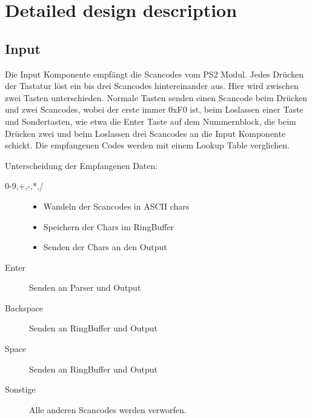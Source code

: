 \section{Detailed design description}



\subsection{Input}
Die Input Komponente empfängt die Scancodes vom PS2 Modul. Jedes Drücken der Tastatur löst ein bis drei Scancodes hintereinander aus.
Hier wird zwischen zwei Tasten unterschieden. Normale Tasten senden einen Scancode beim Drücken und zwei Scancodes, wobei der erste immer 0xF0 ist, 
beim Loslassen einer Taste und Sondertasten, wie etwa die Enter Taste auf dem Nummernblock, die beim Drücken zwei und beim Loslassen drei Scancodes 
an die Input Komponente schickt. 
Die empfangenen Codes werden mit einem Lookup Table verglichen.

Unterscheidung der Empfangenen Daten:
\begin{description}
 \item[0-9,+,-,*,/]
	\begin{itemize}
		\item Wandeln der Scancodes in ASCII chars 
		\item Speichern der Chars im RingBuffer
		\item Senden der Chars an den Output
	\end{itemize}
 \item[Enter] Senden an Parser und Output
 \item[Backspace] Senden an RingBuffer und Output
 \item[Space] Senden an RingBuffer und Output
 \item[Sonstige] Alle anderen Scancodes werden verworfen.
 \end{description}

